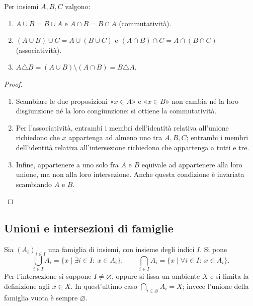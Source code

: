\begin{proposizione}
Per insiemi $A,B,C$ valgono:
\begin{enumerate}[label=\arabic*.]
\item $A\cup B=B\cup A$ e $A\cap B=B\cap A$ (commutatività).
\item $(A\cup B)\cup C=A\cup(B\cup C)$ e $(A\cap B)\cap C=A\cap(B\cap C)$ (associatività).
\item $A\triangle B=(A\cup B)\setminus(A\cap B)=B\triangle A$.
\end{enumerate}
\end{proposizione}
\begin{proof}
\begin{enumerate}[label=\arabic*.]
\item Scambiare le due proposizioni «$x\in A$» e «$x\in B$» non cambia né la loro disgiunzione né la loro congiunzione: si ottiene la commutatività.
\item Per l'associatività, entrambi i membri dell'identità relativa all'unione richiedono che $x$ appartenga ad almeno uno tra $A,B,C$; entrambi i membri dell'identità relativa all'intersezione richiedono che appartenga a tutti e tre.
\item Infine, appartenere a uno solo fra $A$ e $B$ equivale ad appartenere alla loro unione, ma non alla loro intersezione. Anche questa condizione è invariata scambiando $A$ e $B$.
\end{enumerate}
\end{proof}

\subsection{Unioni e intersezioni di famiglie}
\begin{definizione}
Sia $(A_i)_{i\in I}$ una famiglia di insiemi, con insieme degli indici $I$. Si pone
\[
\bigcup_{i\in I}A_i=\{x\mid \exists i\in I:\ x\in A_i\},\qquad
\bigcap_{i\in I}A_i=\{x\mid \forall i\in I:\ x\in A_i\}.
\]
Per l'intersezione si suppone $I\ne\varnothing$, oppure si fissa un ambiente $X$ e si limita la definizione agli $x\in X$. In quest'ultimo caso $\bigcap_{i\in\varnothing}A_i=X$; invece l'unione della famiglia vuota è sempre $\varnothing$.
\end{definizione}

